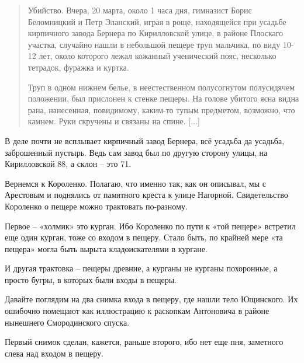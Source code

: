 \begin{quotation}
Убийство. Вчера, 20 марта, около 1 часа дня, гимназист Борис Беломницкий и Петр Эланский, играя в роще, находящейся при усадьбе кирпичного завода Бернера по Кирилловской улице, в районе Плоскаго участка, случайно нашли в небольшой пещере труп мальчика, по виду 10-12 лет, около которого лежал кожанный ученический пояс, несколько тетрадок, фуражка и куртка.

Труп в одном нижнем белье, в неестественном полусогнутом полусидячем положении, был прислонен к стенке пещеры. На голове убитого ясна видна рана, нанесенная, повидимому, каким-то тупым предметом, возможно, что камнем. Руки скручены и связаны на спине. [...]

\end{quotation}

В деле почти не всплывает кирпичный завод Бернера, всё усадьба да усадьба, заброшенный пустырь. Ведь сам завод был по другую сторону улицы, на Кирилловской 88, а склон – это 71.


Вернемся к Короленко. Полагаю, что именно так, как он описывал, мы с Арестовым и поднялись от памятного креста к улице Нагорной. Свидетельство Короленко о пещере можно трактовать по-разному. 

Первое – «холмик» это курган. Ибо Короленко по пути к «той пещере» встретил еще один курган, тоже со входом в пещеру. Стало быть, по крайней мере «та пещера» могла быть вырыта кладоискателями в кургане. 

И другая трактовка – пещеры древние, а курганы не курганы похоронные, а просто бугры, в которых были входы в пещеры.

Давайте поглядим на два снимка входа в пещеру, где нашли тело Ющинского. Их ошибочно помещают как иллюстрацию к раскопкам Антоновича в районе нынешнего Смородинского спуска.

Первый снимок сделан, кажется, раньше второго, ибо нет еще пня, заметного слева над входом в пещеру.

